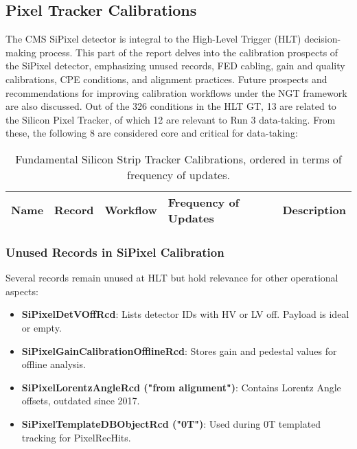 \subsection{Pixel Tracker Calibrations}

The CMS SiPixel detector is integral to the High-Level Trigger (HLT) decision-making process. This part of the report delves into the calibration prospects of the SiPixel detector, emphasizing unused records, FED cabling, gain and quality calibrations, CPE conditions, and alignment practices. Future prospects and recommendations for improving calibration workflows under the NGT framework are also discussed.
Out of the 326 conditions in the HLT GT, 13 are related to the Silicon Pixel Tracker, of which 12 are relevant to Run 3 data-taking. From these, the following 8 are considered core and critical for data-taking:

\begin{table}[h!]
    \centering
    \begin{adjustbox}{max width=\textwidth}
    \begin{tabular}{p{3.5cm}|p{4cm}|p{2.5cm}|p{2cm}|p{4.5cm}}
        \textbf{Name} & \textbf{Record} & \textbf{Workflow} & \textbf{Frequency of Updates} & \textbf{Description} \\ \hline
    \end{tabular}
    \end{adjustbox}
    \caption{Fundamental Silicon Strip Tracker Calibrations, ordered in terms of frequency of updates.}
    \label{tab:PixelCalibrations_critical}
\end{table}

\subsubsection{Unused Records in SiPixel Calibration}
Several records remain unused at HLT but hold relevance for other operational aspects:
\begin{itemize}
    \item \textbf{SiPixelDetVOffRcd}: Lists detector IDs with HV or LV off. Payload is ideal or empty.
    \item \textbf{SiPixelGainCalibrationOfflineRcd}: Stores gain and pedestal values for offline analysis.
    \item \textbf{SiPixelLorentzAngleRcd ("from alignment")}: Contains Lorentz Angle offsets, outdated since 2017.
    \item \textbf{SiPixelTemplateDBObjectRcd ("0T")}: Used during 0T templated tracking for PixelRecHits.
\end{itemize}

